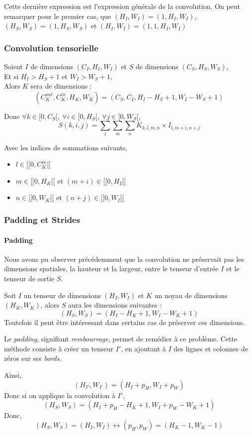 \documentclass[a4paper, 11pt]{report}
\begin{document}
Cette dernière expression est l'expression générale de la convolution.
On peut remarquer pour le premier cas, que $(H_I,W_I) = (1, H_I,W_I)$, $(H_S,W_S) = (1, H_S,W_S)$ et $(H_I,W_I) = (1, 1,  H_I,W_I)$

\subsubsection{Convolution tensorielle}
Soient $I$ de dimensions $(C_I, H_I,W_I)$ et $S$ de dimensions $(C_S, H_S, W_S)$,\\
Et si $H_I > H_S + 1$ et $W_I > W_S + 1$,\\
Alors $K$ sera de dimensions :
$$(C_K^{out}, C_K^{in}, H_K, W_K) = (C_S, C_I, H_I - H_S + 1, W_I - W_S + 1)$$

Donc $\forall k \in [0, C_S[, \ \forall i \in [0, H_S[, \ \forall j \in [0, W_S[$,
$$S(k,i,j) = \sum_{l}\sum_{m}\sum_{n}{K_{k,l,m,n} \times I_{l,m + i, n + j}}$$

Avec les indices de sommations suivants,
\begin{itemize}
	\item $l \in [\![0, C_K^{in}[\![$
	\item $m \in [\![0, H_K[\![$ et $(m + i) \in [\![0, H_I[\![$
	\item $n \in [\![0, W_K[\![$ et $(n + j) \in [\![0, W_I[\![$
\end{itemize}
\subsubsection{Padding et Strides}
\paragraph{Padding}
Nous avons pu observer précédemment que la convolution ne préservait pas les dimensions spatiales, la hauteur et la largeur, entre le tenseur d'entrée $I$ et le tenseur de sortie $S$.

Soit $I$ un tenseur de dimensions $(H_I, W_I)$ et $K$ un noyau de dimensions $(H_K, W_K)$, alors $S$ aura les dimensions suivantes :
$$(H_S, W_S) = (H_I - H_K + 1, W_I - W_K + 1)$$
Toutefois il peut être intéressant dans certains cas de préserver ces dimensions.

Le \emph{padding}, signifiant \emph{rembourrage}, permet de remédier à ce problème. Cette méthode consiste à créer un tenseur $I'$, en ajoutant à $I$ des lignes et colonnes de zéros sur ses \emph{bords}.

Ainsi, $$(H_{I'}, W_{I'}) = (H_I + p_H, W_I + p_W)$$
Donc si on applique la convolution à $I'$,
$$(H_S, W_S) = (H_I + p_H - H_K + 1, W_I + p_W - W_K + 1)$$
Donc,
$$(H_S, W_S) = (H_I, W_I) \leftrightarrow (p_H, p_W) = (H_K - 1, W_K - 1) $$
\end{document}
